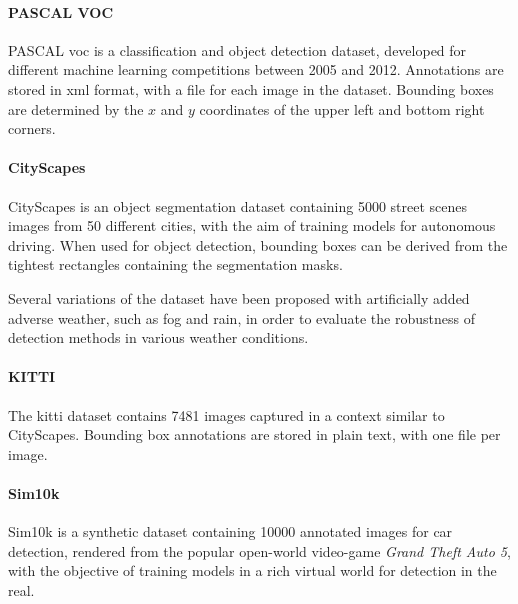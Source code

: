 \documentclass[%
    corpo=12pt,
    twoside,
    stile=classica,   
    tipotesi=magistrale,
    evenboxes,
    english,
	numerazioneromana,
]{toptesi}
\begin{document}
\paragraph{PASCAL VOC}
PASCAL \gls{voc} is a classification and object detection dataset, developed for different machine learning competitions between 2005 and 2012\cite{voc}. Annotations are stored in \acrshort{xml} format, with a file for each image in the dataset. Bounding boxes are determined by the $x$ and $y$ coordinates of the upper left and bottom right corners.

\paragraph{CityScapes}
CityScapes is an object segmentation dataset containing 5000 street scenes images from 50 different cities, with the aim of training models for autonomous driving\cite{cordts2016cityscapes}. When used for object detection, bounding boxes can be derived from the tightest rectangles containing the segmentation masks.

Several variations of the dataset have been proposed with artificially added adverse weather, such as fog\cite{sakaridis2018semantic} and rain\cite{halder2019physicsbased}, in order to evaluate the robustness of detection methods in various weather conditions.

\paragraph{KITTI}
The \gls{kitti} dataset\cite{Geiger2013IJRR} contains 7481 images captured in a context similar to CityScapes. Bounding box annotations are stored in plain text, with one file per image.

\paragraph{Sim10k}
Sim10k is a synthetic dataset containing 10000 annotated images for car detection, rendered from the popular open-world video-game \textit{Grand Theft Auto 5}, with the objective of training models in a rich virtual world for detection in the real\cite{johnsonroberson2017driving}.
\end{document}
